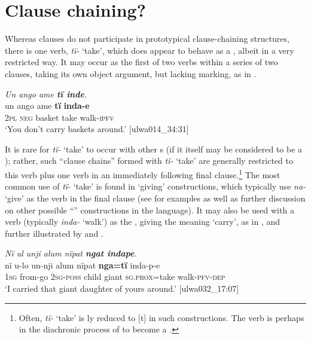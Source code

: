 
\section{Clause chaining?}\label{sec:12.4}


Whereas  clauses do not participate in prototypical clause-chaining structures, there is one verb, \textit{tï-} ‘take’, which does appear to behave as a , albeit in a very restricted way. It may occur as the first of two verbs within a series of two clauses, taking its own object argument, but lacking  marking, as in .

\ea%
    \label{ex:complex:104}
          \textit{Un ango ame \textbf{tï inde}.}\\
\gll un    ango  ame    \textbf{tï}    \textbf{inda-e}\\
    2\textsc{pl}    \textsc{neg}  basket  take  walk-\textsc{ipfv}\\
\glt `You don’t carry baskets around.’ [ulwa014\_34:31]
\z

It is rare for \textit{tï-} ‘take’ to occur with other s (if it itself may be considered to be a ); rather, such “clause chains” formed with \textit{tï-} ‘take’ are generally restricted to this verb plus one verb in an immediately following final clause.\footnote{Often, \textit{tï-} ‘take’ is ly reduced to [t] in such constructions. The verb is perhaps in the diachronic process of  to become a .} The most common  use of \textit{tï-} ‘take’ is found in ‘giving’ constructions, which typically use \textit{na-} ‘give’ as the verb in the final clause (see  for examples as well as further discussion on other possible “” constructions in the language). It may also be used with a  verb (typically \textit{inda-} ‘walk’) as the , giving the meaning ‘carry’, as in , and further illustrated by  and .

\ea%
    \label{ex:complex:105}
          \textit{Nï ul unji alum nïpat \textbf{ngat indape}.}\\
\gll nï    u-lo    un-nji    alum  nïpat   \textbf{nga=tï}     inda-p-e\\
    1\textsc{sg}  from-go  2\textsc{sg-poss}  child  giant  \textsc{sg.prox}=take    walk-\textsc{pfv-dep}\\
\glt `I carried that giant daughter of yours around.’ [ulwa032\_17:07]
\z

